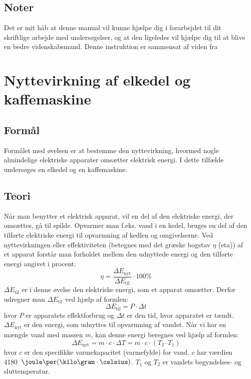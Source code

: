 \section{Noter}
Det er mit håb at denne manual vil kunne hjælpe dig i forarbejdet til dit skriftlige arbejde med undersøgelser, og at den ligeledes vil hjælpe dig til at blive en bedre videnskabsmand. Denne instruktion er sammensat af viden fra \citep{Hand2004, Greenbowe2005, Krogh2016}


\chapter{Nyttevirkning af elkedel og kaffemaskine}
\label{app:B}

\section{Formål}
Formålet med øvelsen er at bestemme den nyttevirkning, hvormed nogle almindelige elektriske apparater omsætter elektrisk energi. I dette tilfælde undersøges en elkedel og en kaffemaskine.

\section{Teori}
Når man benytter et elektrisk apparat, vil en del af den elektriske energi, der omsættes, gå til spilde. Opvarmer man f.eks. vand i en kedel, bruges en del af den tilførte elektriske energi til opvarmning af kedlen og omgivelserne.
Ved nyttevirkningen eller effektiviteten (betegnes med det græske bogstav $\eta$ (eta)) af et apparat forstår man forholdet mellem den udnyttede energi og den tilførte energi angivet i procent:
\begin{equation*}
	\eta = \frac{\Delta E_{\mathrm{nyt}}}{\Delta E_\mathrm{til}}\cdot 100 \%
\end{equation*}
$\Delta E_\mathrm{til}$ er i denne øvelse den elektriske energi, som et apparat omsætter. Derfor udregner man $\Delta E_\mathrm{til}$ ved hjælp af formlen:
\begin{equation*}
\Delta E_\mathrm{til} = P\cdot \Delta t
 \end{equation*}
hvor $P$ er apparatets effektforbrug og $\Delta t$ er den tid, hvor apparatet er tændt.
$\Delta E_{\mathrm{nyt}}$ er den energi, som udnyttes til opvarmning af vandet. Når vi har en mængde vand med massen $m$, kan denne energi beregnes ved hjælp af formlen:
\begin{equation*}
\Delta E_{\mathrm{nyt}} = m\cdot c\cdot \Delta T = m\cdot c\cdot (T_{2} – T_{1})
\end{equation*}
hvor $c$ er den specifikke varmekapacitet (varmefylde) for vand. $c$ har værdien \mbox{4180 $\joule\per(\kilo\gram\cdot\celsius)$}.
$T_1$ og $T_2$ er vandets begyndelses- og sluttemperatur.


